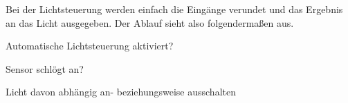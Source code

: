 Bei der Lichtsteuerung werden einfach die Eingänge verundet und das Ergebnis an das Licht ausgegeben. Der Ablauf sieht also folgendermaßen aus.
\item{Automatische Lichtsteuerung aktiviert?}
\item{Sensor schlögt an?}
\item{Licht davon abhängig an- beziehungsweise ausschalten}
